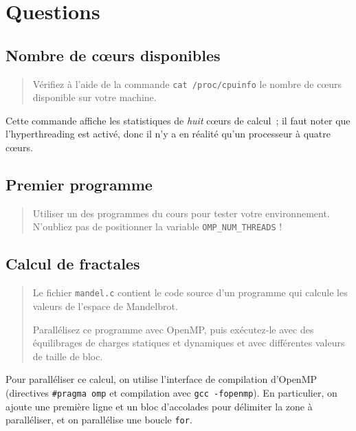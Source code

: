 
\lstset{%
  basicstyle=\footnotesize,
}%

\section{Questions}

\subsection{Nombre de cœurs disponibles}

\begin{quotation}
  Vérifiez à l'aide de la commande \texttt{cat /proc/cpuinfo} le
  nombre de cœurs disponible sur votre machine.
\end{quotation}

Cette commande affiche les statistiques de \emph{huit} cœurs de
calcul~; il faut noter que l'hyperthreading est activé, donc il n'y a
en réalité qu'un processeur à quatre cœurs.

\subsection{Premier programme}

\begin{quotation}
  Utiliser un des programmes du cours pour tester votre
  environnement. N'oubliez pas de positionner la variable
  \texttt{OMP\_NUM\_THREADS} !
\end{quotation}

\subsection{Calcul de fractales}

\begin{quotation}
  Le fichier \texttt{mandel.c} contient le code source d'un programme
  qui calcule les valeurs de l'espace de Mandelbrot.

  Parallélisez ce programme avec OpenMP, puis exécutez-le avec des
  équilibrages de charges statiques et dynamiques et avec différentes
  valeurs de taille de bloc.
\end{quotation}

Pour paralléliser ce calcul, on utilise l'interface de compilation
d'OpenMP (directives \texttt{\#pragma omp} et compilation avec
\texttt{gcc -fopenmp}). En particulier, on ajoute une première ligne
et un bloc d'accolades pour délimiter la zone à paralléliser, et on
parallélise une boucle \texttt{for}.

